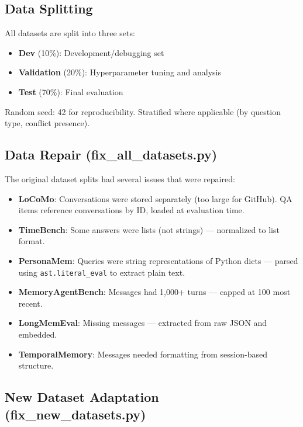 \documentclass[11pt,a4paper]{article}
\begin{document}
\subsection{Data Splitting}

All datasets are split into three sets:
\begin{itemize}
    \item \textbf{Dev} (10\%): Development/debugging set
    \item \textbf{Validation} (20\%): Hyperparameter tuning and analysis
    \item \textbf{Test} (70\%): Final evaluation
\end{itemize}

Random seed: 42 for reproducibility. Stratified where applicable (by question type, conflict presence).

\subsection{Data Repair (fix\_all\_datasets.py)}

The original dataset splits had several issues that were repaired:
\begin{itemize}
    \item \textbf{LoCoMo}: Conversations were stored separately (too large for GitHub). QA items reference conversations by ID, loaded at evaluation time.
    \item \textbf{TimeBench}: Some answers were lists (not strings) --- normalized to list format.
    \item \textbf{PersonaMem}: Queries were string representations of Python dicts --- parsed using \texttt{ast.literal\_eval} to extract plain text.
    \item \textbf{MemoryAgentBench}: Messages had 1,000+ turns --- capped at 100 most recent.
    \item \textbf{LongMemEval}: Missing messages --- extracted from raw JSON and embedded.
    \item \textbf{TemporalMemory}: Messages needed formatting from session-based structure.
\end{itemize}

\subsection{New Dataset Adaptation (fix\_new\_datasets.py)}
\end{document}
